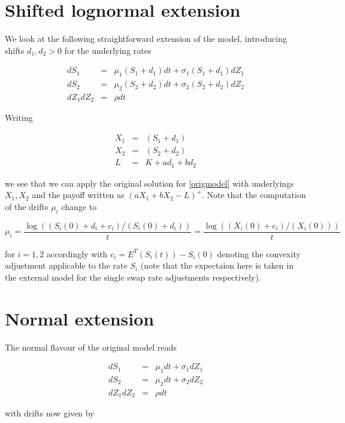 \documentclass{amsart}
\theoremstyle{plain}
\numberwithin{equation}{section}
\begin{document}
\section{Shifted lognormal extension}

We look at the following straightforward extension of the model, introducing shifts $d_1, d_2 >0$ for the underlying rates

\begin{eqnarray}
dS_1 &=& \mu_1 (S_1 + d_1) dt + \sigma_1 (S_1 + d_1) dZ_1 \\
dS_2 &=& \mu_2 (S_2 + d_2) dt + \sigma_2 (S_2 + d_2) dZ_2 \\
dZ_1 dZ_2 &=& \rho dt
\end{eqnarray}

Writing

\begin{eqnarray}
X_1 &=& (S_1 + d_1) \\
X_2 &=& (S_2 + d_2) \\
L &=& K + a d_1 + b d_2 
\end{eqnarray}

we see that we can apply the original solution for \ref{origmodel} with underlyings $X_1, X_2$ and the payoff written as $(aX_1+bX_2-L)^+$. Note that the computation of the drifts $\mu_i$ change to 

\begin{equation}
\mu_i = \frac{\log( (S_i(0)+d_i+c_i) / (S_i(0)+d_i) )}{t} = \frac{\log( (X_i(0)+c_i) / (X_i(0)) )}{t} 
\end{equation}

for $i=1,2$ accordingly with $c_i = E^T(S_i(t)) - S_i(0)$ denoting the convexity adjustment applicable to the rate $S_i$ (note that the expectaion here is taken in the external model for the single swap rate adjustments respectively).

\section{Normal extension}

The normal flavour of the original model reads

\begin{eqnarray}
dS_1 &=& \mu_1 dt + \sigma_1 dZ_1 \\
dS_2 &=& \mu_2 dt + \sigma_2 dZ_2 \\
dZ_1 dZ_2 &=& \rho dt
\end{eqnarray}

with drifts now given by
\end{document}
